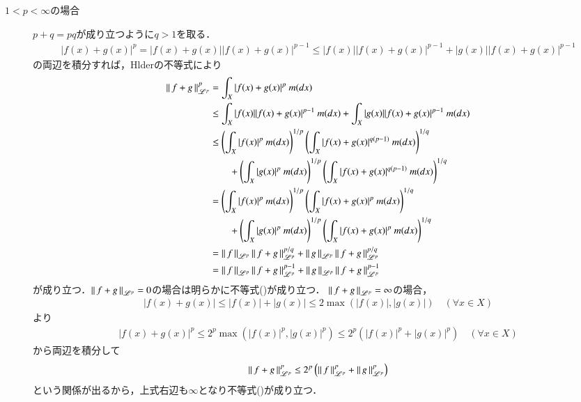 \begin{prf}
\begin{description}
		\item[$1 < p < \infty$の場合]
			$p + q = pq$が成り立つように$q > 1$を取る．
			\begin{align}
				|f(x) + g(x)|^p = |f(x) + g(x)||f(x) + g(x)|^{p-1} \leq |f(x)||f(x) + g(x)|^{p-1} + |g(x)||f(x) + g(x)|^{p-1}
			\end{align}
			の両辺を積分すれば，Hlderの不等式により
			\begin{align}
				\left\|\, f+g\, \right\|_{\mathscr{L}^p}^p &= \int_{X} |f(x) + g(x)|^p\ m(dx) \\
				&\leq \int_{X} |f(x)||f(x) + g(x)|^{p-1}\ m(dx) + \int_{X} |g(x)||f(x) + g(x)|^{p-1}\ m(dx) \\
				&\leq \left( \int_{X} |f(x)|^p\ m(dx) \right)^{1/p} \left( \int_{X} |f(x) + g(x)|^{q(p-1)}\ m(dx) \right)^{1/q} \\
					&\qquad + \left( \int_{X} |g(x)|^p\ m(dx) \right)^{1/p} \left( \int_{X} |f(x) + g(x)|^{q(p-1)}\ m(dx) \right)^{1/q} \\
				&= \left( \int_{X} |f(x)|^p\ m(dx) \right)^{1/p} \left( \int_{X} |f(x) + g(x)|^p\ m(dx) \right)^{1/q} \\
					&\qquad + \left( \int_{X} |g(x)|^p\ m(dx) \right)^{1/p} \left( \int_{X} |f(x) + g(x)|^p\ m(dx) \right)^{1/q} \\
				&= \left\|\, f\, \right\|_{\mathscr{L}^p}\left\|\, f+g\, \right\|_{\mathscr{L}^p}^{p/q} + \left\|\, g\, \right\|_{\mathscr{L}^p}\left\|\, f+g\, \right\|_{\mathscr{L}^p}^{p/q} \\
				&= \left\|\, f\, \right\|_{\mathscr{L}^p}\left\|\, f+g\, \right\|_{\mathscr{L}^p}^{p-1} + \left\|\, g\, \right\|_{\mathscr{L}^p}\left\|\, f+g\, \right\|_{\mathscr{L}^p}^{p-1}
			\end{align}
			が成り立つ．$\left\|\, f+g\, \right\|_{\mathscr{L}^p} = 0$の場合は明らかに不等式()が成り立つ．
			$\left\|\, f+g\, \right\|_{\mathscr{L}^p} = \infty$の場合，
			\begin{align}
				|f(x) + g(x)| \leq |f(x)| + |g(x)| \leq 2 \max{}{(|f(x)|,|g(x)|)} \quad (\forall x \in X)
			\end{align}
			より
			\begin{align}
				|f(x) + g(x)|^p \leq 2^p \max{}{\left( |f(x)|^p,|g(x)|^p \right)} \leq 2^p \left( |f(x)|^p + |g(x)|^p \right) \quad (\forall x \in X)
			\end{align}
			から両辺を積分して
			\begin{align}
				\left\|\, f+g\, \right\|_{\mathscr{L}^p}^p \leq 2^p \left( \left\|\, f\, \right\|_{\mathscr{L}^p}^p + \left\|\, g\, \right\|_{\mathscr{L}^p}^p \right)
			\end{align}
			という関係が出るから，上式右辺も$\infty$となり不等式()が成り立つ．

\end{description}
\end{prf}
